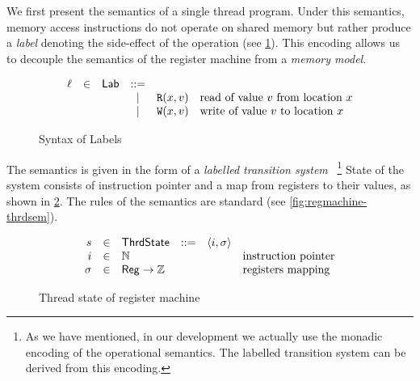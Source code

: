 We first present the semantics of a single thread program.
Under this semantics, memory access instructions 
do not operate on shared memory
but rather produce a \emph{label}
denoting the side-effect of the operation 
(see \cref{fig:label-syntax}).
This encoding allows us to decouple 
the semantics of the register machine 
from a \emph{memory model}.

\begin{figure}[h!]
\[
\begin{array}{rclclll}

  \ell &\in& \mathsf{Lab}  &::=&                                & \text{}             \\
              & &  & | & {\mathtt{R}}({x},{v})                    & \text{read of value $v$ from location $x$}   \\
              & &  & | & {\mathtt{W}}({x},{v})                    & \text{write of value $v$ to location $x$}    \\

\end{array}
\] 
\caption{Syntax of Labels}
\label{fig:label-syntax}
\end{figure}

The semantics is given in the form of a
\emph{labelled transition system}~%
\footnote{As we have mentioned, in our \coq development we actually use 
the monadic encoding of the operational semantics. 
The labelled transition system can be derived from this encoding.}
State of the system consists of instruction pointer
and a map from registers to their values, 
as shown in \cref{fig:regmachine-thrdstate}. 
The rules of the semantics are standard 
(see \cref{fig:regmachine-thrdsem}).

\begin{figure}[h!]
\[
\begin{array}{rclclll}

  s          &\in& \mathsf{ThrdState}    &::=& \langle i, \sigma \rangle &                         \\
  i     &\in& {\mathbb{N}}            &   &                    & \text{instruction pointer} \\
  \sigma    &\in& \mathsf{Reg} \rightarrow {\mathbb{Z}}  &   &                    & \text{registers mapping}   \\

\end{array}
\] 
\caption{Thread state of register machine}
\label{fig:regmachine-thrdstate}
\end{figure}



